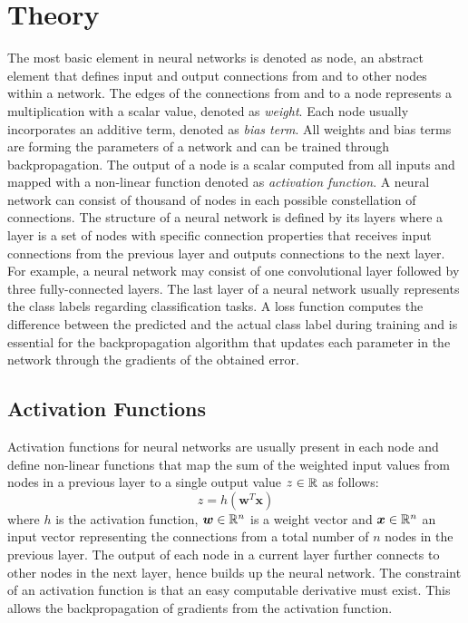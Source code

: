 
\section{Theory}\label{sec:nn_theory}
The most basic element in neural networks is denoted as node, an abstract element that defines input and output connections from and to other nodes within a network.
The edges of the connections from and to a node represents a multiplication with a scalar value, denoted as \emph{weight}.
Each node usually incorporates an additive term, denoted as \emph{bias term}.
All weights and bias terms are forming the parameters of a network and can be trained through backpropagation.
The output of a node is a scalar computed from all inputs and mapped with a non-linear function denoted as \emph{activation function}.
A neural network can consist of thousand of nodes in each possible constellation of connections.
The structure of a neural network is defined by its layers where a layer is a set of nodes with specific connection properties that receives input connections from the previous layer and outputs connections to the next layer.
For example, a neural network may consist of one convolutional layer followed by three fully-connected layers.
The last layer of a neural network usually represents the class labels regarding classification tasks.
A loss function computes the difference between the predicted and the actual class label during training and is essential for the backpropagation algorithm that updates each parameter in the network through the gradients of the obtained error.



\subsection{Activation Functions}\label{sec:nn_theory_acti}
Activation functions for neural networks are usually present in each node and define non-linear functions that map the sum of the weighted input values from nodes in a previous layer to a single output value $z \in \mathbb{R}$ as follows:
\begin{equation}\label{eq:nn_theory_acti}
  z = h(\bm{w}^T \bm{x})
\end{equation}
where $h$ is the activation function, $\bm{w} \in \mathbb{R}^n$ is a weight vector and $\bm{x} \in \mathbb{R}^n$ an input vector representing the connections from a total number of $n$ nodes in the previous layer.
The output of each node in a current layer further connects to other nodes in the next layer, hence builds up the neural network.
The constraint of an activation function is that an easy computable derivative must exist.
This allows the backpropagation of gradients from the activation function.

